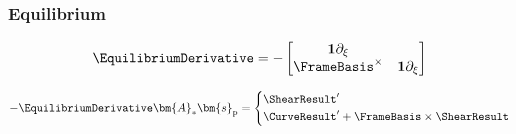 \subsubsection{Equilibrium}

\begin{equation}
\EquilibriumDerivative = -\begin{bmatrix}
\mathbf{1} \partial_{\xi} &  \\
\FrameBasis^\times & \mathbf{1} \partial_{\xi}  \\
\end{bmatrix}
\end{equation}

\begin{equation*}
-\EquilibriumDerivative\bm{A}_* \bm{s}_{\mathrm{p}} = \left\{\begin{aligned}
& \ShearResult^{\prime} \\
& \CurveResult^{\prime} + \FrameBasis \times\ShearResult
\end{aligned}
\right.
\end{equation*}

